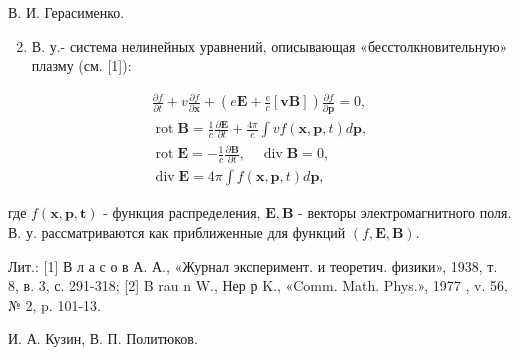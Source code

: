 \documentclass[10pt]{article}
\begin{document}
В. И. Герасименко.



\begin{enumerate}

  \setcounter{enumi}{1}

  \item В. у.- система нелинейных уравнений, описывающая «бесстолкновительную» плазму (см. [1]):

\end{enumerate}



\[

\begin{gathered}

\frac{\partial f}{\partial t}+v \frac{\partial f}{\partial \boldsymbol{x}}+\left(e \boldsymbol{E}+\frac{e}{c}[\boldsymbol{v} \boldsymbol{B}]\right) \frac{\partial f}{\partial \boldsymbol{p}}=0, \\

\operatorname{rot} \boldsymbol{B}=\frac{1}{c} \frac{\partial \boldsymbol{E}}{\partial t}+\frac{4 \pi}{c} \int v f(\boldsymbol{x}, \boldsymbol{p}, t) d \boldsymbol{p}, \\

\operatorname{rot} \boldsymbol{E}=-\frac{1}{c} \frac{\partial \boldsymbol{B}}{\partial t}, \quad \operatorname{div} \boldsymbol{B}=0, \\

\operatorname{div} \boldsymbol{E}=4 \pi \int f(\boldsymbol{x}, \boldsymbol{p}, t) d \boldsymbol{p},

\end{gathered}

\]



где $f(\boldsymbol{x}, \boldsymbol{p}, \boldsymbol{t})$ - функция распределения, $\boldsymbol{E}, \boldsymbol{B}$ - векторы электромагнитного поля. В. у. рассматриваются как приближенные для функций $(f, \boldsymbol{E}, \boldsymbol{B})$.



Лит.: [1] В л а с о в А. А., «Журнал эксперимент. и теоретич. физики», 1938, т. 8, в. 3, с. 291-318; [2] B rau n W., Нер р K., «Comm. Math. Phys.», 1977 , v. 56, № 2, p. 101-13.



И. А. Кузин, В. П. Политюков.
\end{document}
